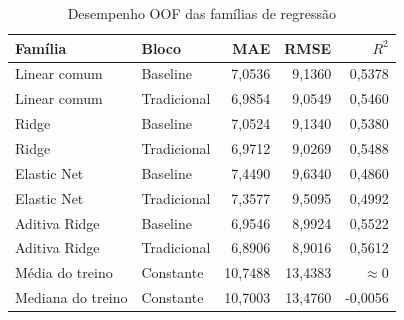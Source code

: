 \begin{table}[htbp]
\centering\small
\caption{Desempenho OOF das famílias de regressão}\label{tab:modelos}
\begin{tabular}{llrrr}
\toprule
Família & Bloco & MAE & RMSE & $R^2$\\\midrule
Linear comum & Baseline & 7,0536 & 9,1360 & 0,5378\\
Linear comum & Tradicional & 6,9854 & 9,0549 & 0,5460\\
Ridge & Baseline & 7,0524 & 9,1340 & 0,5380\\
Ridge & Tradicional & 6,9712 & 9,0269 & 0,5488\\
Elastic Net & Baseline & 7,4490 & 9,6340 & 0,4860\\
Elastic Net & Tradicional & 7,3577 & 9,5095 & 0,4992\\
Aditiva Ridge & Baseline & 6,9546 & 8,9924 & 0,5522\\
Aditiva Ridge & Tradicional & 6,8906 & 8,9016 & 0,5612\\
Média do treino & Constante & 10,7488 & 13,4383 & $\approx 0$\\
Mediana do treino & Constante & 10,7003 & 13,4760 & -0,0056\\
\bottomrule
\end{tabular}
\end{table}
